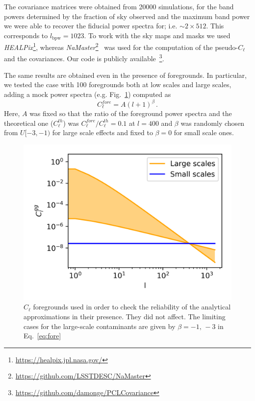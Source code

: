 \documentclass[a4paper,11pt]{article}
\newcommand{\clth}{C_\ell^{th}}
\newcommand{\clf}{C_\ell^{fore}}
\newcommand{\cl}{C_\ell}
\begin{document}
The covariance matrices were obtained from 20000 simulations, for the band
powers determined by the fraction of sky observed and the maximum band power
we were able to recover the fiducial power spectra for; i.e. $\sim 2 \times
512$. This corresponds to $l_{\mbox{bpw}} = 1023$. To work with the sky
maps and masks we used
\textit{HEALPix}\footnote{\url{https://healpix.jpl.nasa.gov/}}, whereas 
\textit{NaMaster}\footnote{\url{https://github.com/LSSTDESC/NaMaster}}~\cite{2018arXiv180909603A}
was used for the computation of the pseudo-$\cl$ and the covariances. Our code
is publicly
available~\footnote{\url{https://github.com/damonge/PCLCovariance}}.

The same results are obtained even in the presence of foregrounds. In
particular, we tested the case with 100 foregrounds both at low scales and
large scales, adding a mock power spectra (e.g. Fig.~\ref{fig:fore}) computed as 
\begin{equation}
  \clf = A (l + 1)^{\beta}\,.
  \label{eq:fore}
\end{equation}
Here, $A$ was fixed so that the ratio of the foreground power spectra and the
theoretical one ($\clth$) was $\clf/\clth = 0.1$ at $l=400$ and $\beta$ was
randomly chosen from $U[-3, -1)$ for large scale effects and fixed to $\beta =
0$ for small scale ones. 

\begin{figure}
  \centering
  \includegraphics[width=\columnwidth]{./figures/foreground.png}
  \caption{$\cl$ foregrounds used in order to check the reliability of the
    analytical approximations in their presence. They did not affect. The
    limiting cases for the large-scale contaminants are given by $\beta=-1,\,
    -3$ in Eq.~\ref{eq:fore}}
  \label{fig:fore}
\end{figure}
\end{document}
